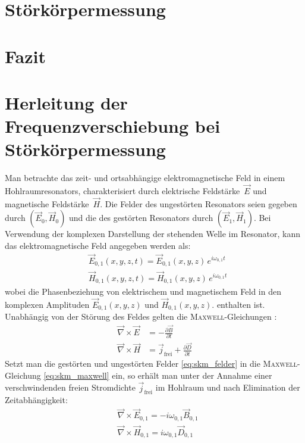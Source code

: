 \documentclass[11pt, a4paper]{scrbook}
\newcommand{\vnabla}{\vec{\nabla}}
\newcommand{\ve}{\vec{E}}
\newcommand{\vb}{\vec{B}}
\newcommand{\vh}{\vec{H}}
\newcommand{\vd}{\vec{D}}
\begin{document}
	\chapter{Störkörpermessung}
	
	\chapter{Fazit}
	
	\appendix
	\chapter{Herleitung der Frequenzverschiebung bei Störkörpermessung}
	\label{app:herleitung_frequenzverschiebung}
	Man betrachte das zeit- und ortsabhängige elektromagnetische Feld in einem Hohlraumresonators, charakterisiert durch elektrische Feldstärke~$\ve$ und magnetische Feldstärke~$\vh$.
	Die Felder des ungestörten Resonators seien gegeben durch $(\ve_0, \vh_0)$ und die des gestörten Resonators durch $(\ve_1, \vh_1)$.
	Bei Verwendung der komplexen Darstellung der stehenden Welle im Resonator, kann das elektromagnetische Feld angegeben werden als:
	\begin{subequations}
		\label{eq:skm_felder}
		\begin{align}
		&\ve_{0,1}(x,y,z,t) = \ve_{0,1}(x,y,z) \, e^{i \omega_{0,1} t}\\
		&\vh_{0,1}(x,y,z,t) = \vh_{0,1}(x,y,z) \, e^{i \omega_{0,1} t}
		\end{align}
	\end{subequations}
	wobei die Phasenbeziehung von elektrischem und magnetischem Feld in den komplexen Amplituden $\ve_{0,1}(x,y,z)$ und $\vh_{0,1}(x,y,z)$. enthalten ist.
	Unabhängig von der Störung des Feldes gelten die \textsc{Maxwell}-Gleichungen \cite{jackson}:
	\begin{subequations}
		\label{eq:skm_maxwell}
		\begin{align}
			\vnabla \times \ve &= - \frac{\partial \vb}{\partial t}\\
			\vnabla \times \vh &= \vec{j}_\mathrm{frei} + \frac{\partial \vd}{\partial t}
		\end{align}
	\end{subequations}
	Setzt man die gestörten und ungestörten Felder \eqref{eq:skm_felder} in die \textsc{Maxwell}-Gleichung \eqref{eq:skm_maxwell} ein, so erhält man unter der Annahme einer verschwindenden freien Stromdichte $\vec{j}_\mathrm{frei}$ im Hohlraum und nach Elimination der Zeitabhängigkeit:
	\begin{subequations}
		\label{eq:skm_zeitunabhaengig}
		\begin{align}
			&\vnabla \times \ve_{0,1} = - i \omega_{0,1} \vb_{0,1} \\
			&\vnabla \times \vh_{0,1} = i \omega_{0,1} \vd_{0,1}
		\end{align}
	\end{subequations}
\end{document}
